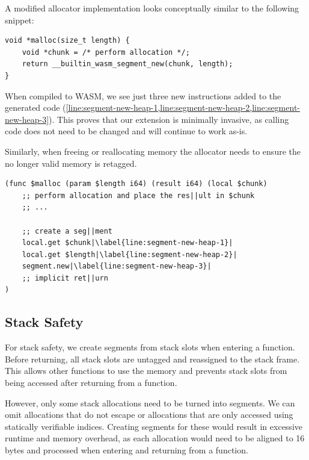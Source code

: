 A modified allocator implementation looks conceptually similar to the following snippet:

\begin{lstlisting}[frame=h,style=customc,
    label={lst:heap-allocator-example}]
void *malloc(size_t length) {
    void *chunk = /* perform allocation */;
    return __builtin_wasm_segment_new(chunk, length);
}
\end{lstlisting}

When compiled to \ac{WASM}, we see just three new instructions added to the generated code (\cref{line:segment-new-heap-1,line:segment-new-heap-2,line:segment-new-heap-3}).
This proves that our extension is minimally invasive, as calling code does not need to be changed and will continue to work as-is.

Similarly, when freeing or reallocating memory the allocator needs to ensure the no longer valid memory is retagged.

\begin{lstlisting}[frame=h,style=customwasm,
    label={lst:wasm-allocator-example},escapechar=|]
(func $malloc (param $length i64) (result i64) (local $chunk)
    ;; perform allocation and place the res||ult in $chunk
    ;; ...

    ;; create a seg||ment
    local.get $chunk|\label{line:segment-new-heap-1}|
    local.get $length|\label{line:segment-new-heap-2}|
    segment.new|\label{line:segment-new-heap-3}|
    ;; implicit ret||urn
)
\end{lstlisting}

\subsection{Stack Safety}
\label{subsec:stack-safety}

For stack safety, we create segments from stack slots when entering a function.
Before returning, all stack slots are untagged and reassigned to the stack frame.
This allows other functions to use the memory and prevents stack slots from being accessed after returning from a function.

However, only some stack allocations need to be turned into segments.
We can omit allocations that do not escape or allocations that are only accessed using statically verifiable indices.
Creating segments for these would result in excessive runtime and memory overhead, as each allocation would need to be aligned to 16\,bytes and processed when entering and returning from a function.

